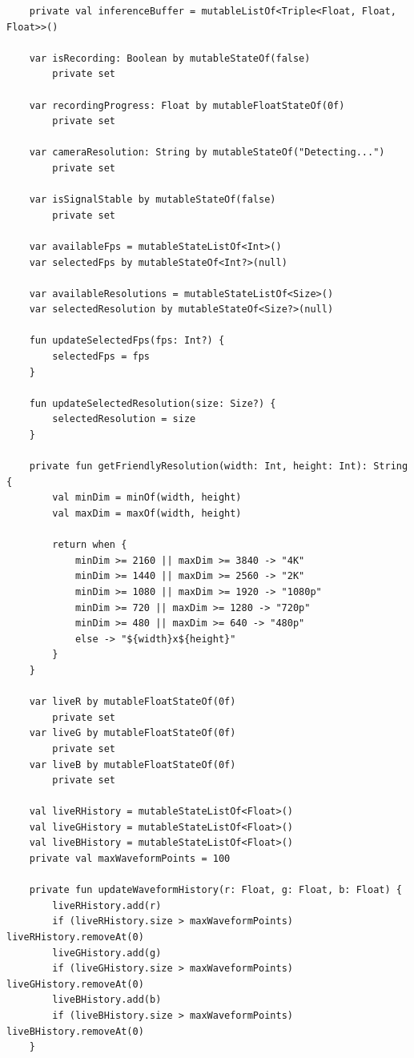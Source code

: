 \begin{verbatim}
    private val inferenceBuffer = mutableListOf<Triple<Float, Float, Float>>()

    var isRecording: Boolean by mutableStateOf(false)
        private set

    var recordingProgress: Float by mutableFloatStateOf(0f)
        private set

    var cameraResolution: String by mutableStateOf("Detecting...")
        private set

    var isSignalStable by mutableStateOf(false)
        private set

    var availableFps = mutableStateListOf<Int>()
    var selectedFps by mutableStateOf<Int?>(null)

    var availableResolutions = mutableStateListOf<Size>()
    var selectedResolution by mutableStateOf<Size?>(null)

    fun updateSelectedFps(fps: Int?) {
        selectedFps = fps
    }

    fun updateSelectedResolution(size: Size?) {
        selectedResolution = size
    }

    private fun getFriendlyResolution(width: Int, height: Int): String {
        val minDim = minOf(width, height)
        val maxDim = maxOf(width, height)
        
        return when {
            minDim >= 2160 || maxDim >= 3840 -> "4K"
            minDim >= 1440 || maxDim >= 2560 -> "2K"
            minDim >= 1080 || maxDim >= 1920 -> "1080p"
            minDim >= 720 || maxDim >= 1280 -> "720p"
            minDim >= 480 || maxDim >= 640 -> "480p"
            else -> "${width}x${height}"
        }
    }

    var liveR by mutableFloatStateOf(0f)
        private set
    var liveG by mutableFloatStateOf(0f)
        private set
    var liveB by mutableFloatStateOf(0f)
        private set

    val liveRHistory = mutableStateListOf<Float>()
    val liveGHistory = mutableStateListOf<Float>()
    val liveBHistory = mutableStateListOf<Float>()
    private val maxWaveformPoints = 100

    private fun updateWaveformHistory(r: Float, g: Float, b: Float) {
        liveRHistory.add(r)
        if (liveRHistory.size > maxWaveformPoints) liveRHistory.removeAt(0)
        liveGHistory.add(g)
        if (liveGHistory.size > maxWaveformPoints) liveGHistory.removeAt(0)
        liveBHistory.add(b)
        if (liveBHistory.size > maxWaveformPoints) liveBHistory.removeAt(0)
    }


\end{verbatim}
